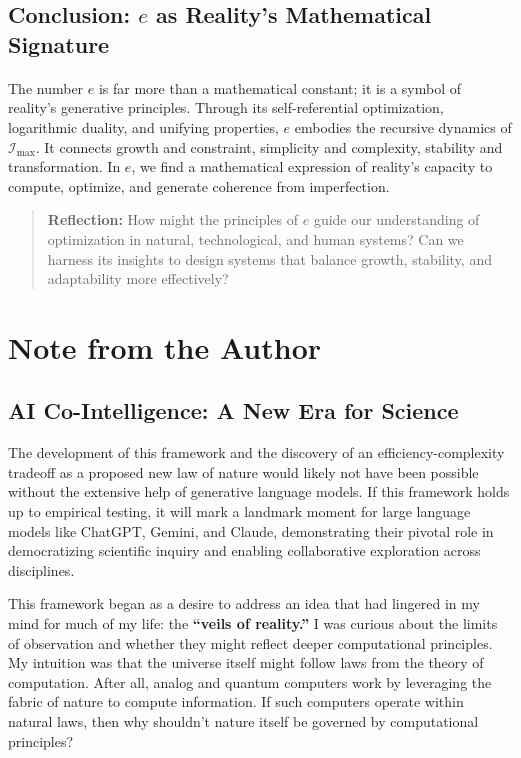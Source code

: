 \documentclass[12pt]{article}
\begin{document}
\subsection{Conclusion: \(e\) as Reality’s Mathematical Signature}
\paragraph{}
The number \(e\) is far more than a mathematical constant; it is a symbol of reality’s generative principles. Through its self-referential optimization, logarithmic duality, and unifying properties, \(e\) embodies the recursive dynamics of \(\mathcal{I}_{\text{max}}\). It connects growth and constraint, simplicity and complexity, stability and transformation. In \(e\), we find a mathematical expression of reality’s capacity to compute, optimize, and generate coherence from imperfection.

\begin{quote}
\textbf{Reflection:}  
How might the principles of \(e\) guide our understanding of optimization in natural, technological, and human systems? Can we harness its insights to design systems that balance growth, stability, and adaptability more effectively?
\end{quote}


\section*{Note from the Author}

\subsection*{AI Co-Intelligence: A New Era for Science}

The development of this framework and the discovery of an efficiency-complexity tradeoff as a proposed new law of nature would likely not have been possible without the extensive help of generative language models. If this framework holds up to empirical testing, it will mark a landmark moment for large language models like ChatGPT, Gemini, and Claude, demonstrating their pivotal role in democratizing scientific inquiry and enabling collaborative exploration across disciplines.

This framework began as a desire to address an idea that had lingered in my mind for much of my life: the \textbf{``veils of reality.''} I was curious about the limits of observation and whether they might reflect deeper computational principles. My intuition was that the universe itself might follow laws from the theory of computation. After all, analog and quantum computers work by leveraging the fabric of nature to compute information. If such computers operate within natural laws, then why shouldn’t nature itself be governed by computational principles?
\end{document}
